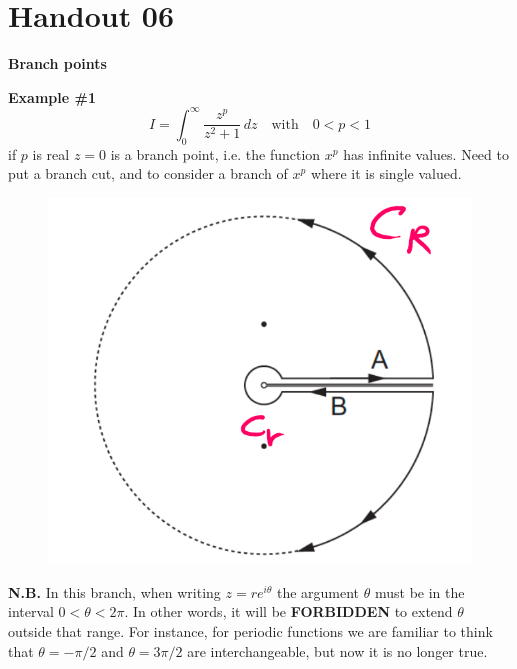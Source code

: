 \documentclass{article}
\begin{document}
\section{Handout 06}

\noindent
\large\textbf{Branch points}

\normalsize
\noindent
\textbf{Example \#1}
\begin{equation}
    I = \int_0^{\infty} \frac{z^p}{z^2 + 1} \, dz \quad \text{with} \quad 0 < p < 1
\end{equation}
if $p$ is real $z=0$ is a branch point, i.e. the function $x^p$ has infinite values. Need to put a branch cut, and to consider a branch of $x^p$ where it is single valued.

\begin{figure}[h]
    \centering
    \includegraphics[width=0.35\linewidth]{fig40.png}
\end{figure}

\noindent
\textbf{N.B.} In this branch, when writing $z=re^{i\theta}$ the argument $\theta$ must be in the interval $0<\theta<2\pi$. In other words, it will be \textbf{FORBIDDEN} to extend $\theta$ outside that range. For instance, for periodic functions we are familiar to think that $\theta =-\pi/2$ and $\theta =3\pi/2$ are interchangeable, but now it is no longer true.

\newpage
\end{document}
